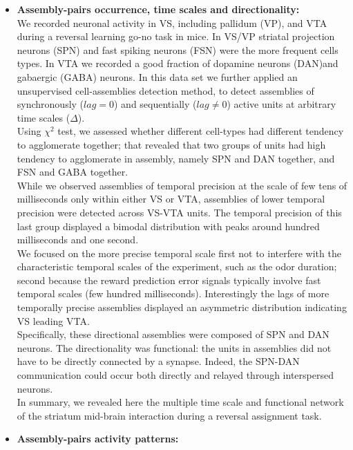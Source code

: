\begin{itemize}
    \item \textbf{Assembly-pairs occurrence, time scales and directionality:}\\We recorded neuronal activity in VS, including pallidum (VP), and VTA during a reversal learning go-no task in mice. In VS/VP striatal projection neurons (SPN) and fast spiking neurons (FSN) were the more frequent cells types. In VTA we recorded a good fraction of dopamine neurons (DAN)and  gabaergic (GABA) neurons. In this data set we further applied an unsupervised cell-assemblies detection method, to detect assemblies of synchronously ($lag=0$) and sequentially ($lag\neq0$) active units at arbitrary time scales ($\Delta$).\\Using $\chi^2$ test, we assessed whether different cell-types had different tendency to agglomerate together; that revealed that two groups of units had high tendency to agglomerate in assembly, namely SPN and DAN together, and FSN and GABA together.\\While we observed assemblies of temporal precision at the scale of few tens of milliseconds only within either VS or VTA, assemblies of lower temporal precision were detected across VS-VTA units. The temporal precision of this last group displayed a bimodal distribution with peaks around hundred milliseconds and one second.\\We focused on the more precise temporal scale first not to interfere with the characteristic temporal scales of the experiment, such as the odor duration; second because the reward prediction error signals typically involve fast temporal scales (few hundred milliseconds). Interestingly the lags of more temporally precise assemblies displayed an asymmetric distribution indicating VS leading VTA.\\ Specifically, these directional assemblies were composed of SPN and DAN neurons. The directionality was functional: the units in assemblies did not have to be directly connected by a synapse. Indeed, the SPN-DAN communication could occur both directly and relayed through interspersed neurons.\\In summary, we revealed here the multiple time scale and functional network of the striatum mid-brain interaction during a reversal assignment task.  
    \item \textbf{Assembly-pairs activity patterns:}\\

\end{itemize}
